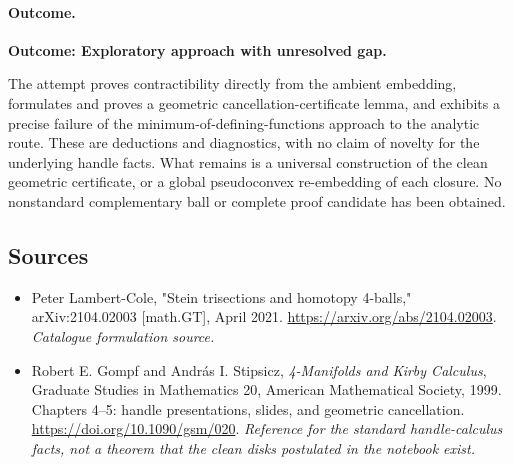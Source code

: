 \documentclass[11pt,a4paper]{article}
\numberwithin{equation}{section}
\begin{document}
\paragraph{Outcome.}
\textbf{Outcome: Exploratory approach with unresolved gap.}

The attempt proves contractibility directly from the ambient embedding,
formulates and proves a geometric cancellation-certificate lemma, and
exhibits a precise failure of the minimum-of-defining-functions approach
to the analytic route. These are deductions and diagnostics, with no
claim of novelty for the underlying handle facts. What remains is a
universal construction of the clean geometric certificate, or a global
pseudoconvex re-embedding of each closure. No nonstandard complementary
ball or complete proof candidate has been obtained.

\subsection{Sources}
\begin{itemize}\raggedright
\item[\textnormal{[S1]}]\hypertarget{source:statement:1}{} Peter Lambert-Cole, "Stein trisections and homotopy 4-balls," arXiv:2104.02003 [math.GT], April 2021.
\url{https://arxiv.org/abs/2104.02003}.
{\small\textit{Catalogue formulation source.}}
\item[\textnormal{[E1]}]\hypertarget{extra:statement:1}{} Robert E. Gompf and Andr\'as I. Stipsicz, \emph{4-Manifolds and Kirby Calculus}, Graduate Studies in Mathematics 20, American Mathematical Society, 1999. Chapters 4--5: handle presentations, slides, and geometric cancellation.
\url{https://doi.org/10.1090/gsm/020}.
{\small\textit{Reference for the standard handle-calculus facts, not a theorem that the clean disks postulated in the notebook exist.}}
\end{itemize}
\end{document}
